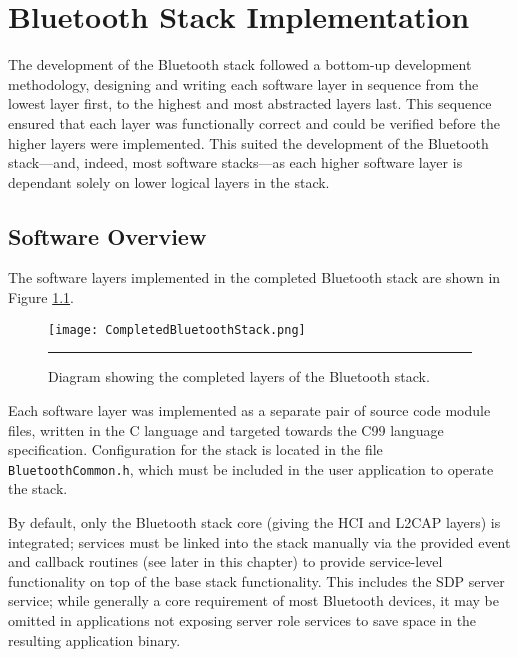 \chapter{Bluetooth Stack Implementation}
\label{chp:btstackimp}

The development of the Bluetooth stack followed a bottom-up development methodology, designing and writing each software layer in sequence from the lowest layer first, to the highest and most abstracted layers last. This sequence ensured that each layer was functionally correct and could be verified before the higher layers were implemented. This suited the development of the Bluetooth stack---and, indeed, most software stacks---as each higher software layer is dependant solely on lower logical layers in the stack.

\section{Software Overview}

The software layers implemented in the completed Bluetooth stack are shown in Figure \ref{fig:completedbtstacklayers}.

\begin{figure}[tbph]
	\vspace{1em}
	\centering
		\texttt{[image: CompletedBluetoothStack.png]}
	\rule{35em}{0.5pt}
	\caption[Diagram of the completed Bluetooth stack layers]{Diagram showing the completed layers of the Bluetooth stack.}
	\label{fig:completedbtstacklayers}
\end{figure}

Each software layer was implemented as a separate pair of source code module files, written in the C language and targeted towards the C99 language specification. Configuration for the stack is located in the file \texttt{BluetoothCommon.h}, which must be included in the user application to operate the stack.

By default, only the Bluetooth stack core (giving the HCI and L2CAP layers) is integrated; services must be linked into the stack manually via the provided event and callback routines (see later in this chapter) to provide service-level functionality on top of the base stack functionality. This includes the SDP server service; while generally a core requirement of most Bluetooth devices, it may be omitted in applications not exposing server role services to save space in the resulting application binary.

